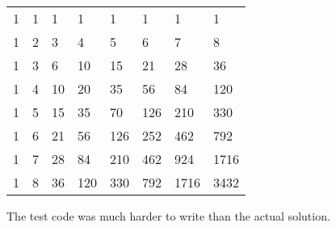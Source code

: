 \documentclass[
]{article}
\begin{document}
\begin{longtable}[]{@{}llllllll@{}}
\toprule
\endhead
1 & 1 & 1 & 1 & 1 & 1 & 1 & 1 \\
1 & 2 & 3 & 4 & 5 & 6 & 7 & 8 \\
1 & 3 & 6 & 10 & 15 & 21 & 28 & 36 \\
1 & 4 & 10 & 20 & 35 & 56 & 84 & 120 \\
1 & 5 & 15 & 35 & 70 & 126 & 210 & 330 \\
1 & 6 & 21 & 56 & 126 & 252 & 462 & 792 \\
1 & 7 & 28 & 84 & 210 & 462 & 924 & 1716 \\
1 & 8 & 36 & 120 & 330 & 792 & 1716 & 3432 \\
\bottomrule
\end{longtable}

The test code was much harder to write than the actual solution.
\end{document}
